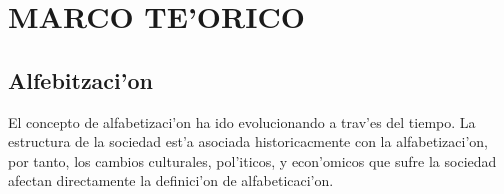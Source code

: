 
\chapter{MARCO TE'ORICO}



\section{Alfebitzaci'on}






El concepto de alfabetizaci'on ha ido evolucionando a trav'es del tiempo. La estructura de la
sociedad est'a asociada historicacmente con la alfabetizaci'on, por tanto, los cambios culturales,
pol'iticos, y econ'omicos que sufre la sociedad afectan directamente la definici'on de alfabeticaci'on.

